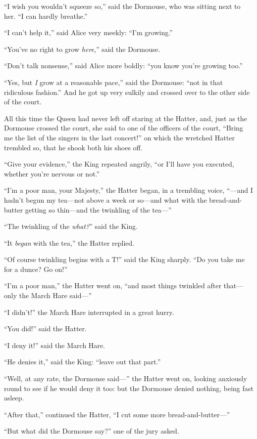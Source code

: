 \documentclass[11pt,openany,oneside]{book}
\begin{document}
“I wish you wouldn’t squeeze so,” said the Dormouse, who was sitting next to her. “I can hardly breathe.” 

“I can’t help it,” said Alice very meekly: “I’m growing.” 

“You’ve no right to grow {\em here\/},” said the Dormouse. 

“Don’t talk nonsense,” said Alice more boldly: “you know you’re growing too.” 

“Yes, but {\em I\/} grow at a reasonable pace,” said the Dormouse: “not in that ridiculous fashion.” And he got up very sulkily and crossed over to the other side of the court. 

All this time the Queen had never left off staring at the Hatter, and, just as the Dormouse crossed the court, she said to one of the officers of the court, “Bring me the list of the singers in the last concert!” on which the wretched Hatter trembled so, that he shook both his shoes off. 

“Give your evidence,” the King repeated angrily, “or I’ll have you executed, whether you’re nervous or not.” 

“I’m a poor man, your Majesty,” the Hatter began, in a trembling voice, “—and I hadn’t begun my tea—not above a week or so—and what with the bread-and-butter getting so thin—and the twinkling of the tea—” 

“The twinkling of the {\em what?\/}” said the King. 

“It {\em began\/} with the tea,” the Hatter replied. 

“Of course twinkling begins with a T!” said the King sharply. “Do you take me for a dunce? Go on!” 

“I’m a poor man,” the Hatter went on, “and most things twinkled after that—only the March Hare said—” 

“I didn’t!” the March Hare interrupted in a great hurry. 

“You did!” said the Hatter. 

“I deny it!” said the March Hare. 

“He denies it,” said the King: “leave out that part.” 

“Well, at any rate, the Dormouse said—” the Hatter went on, looking anxiously round to see if he would deny it too: but the Dormouse denied nothing, being fast asleep. 

“After that,” continued the Hatter, “I cut some more bread-and-butter—” 

“But what did the Dormouse say?” one of the jury asked. 
\end{document}
